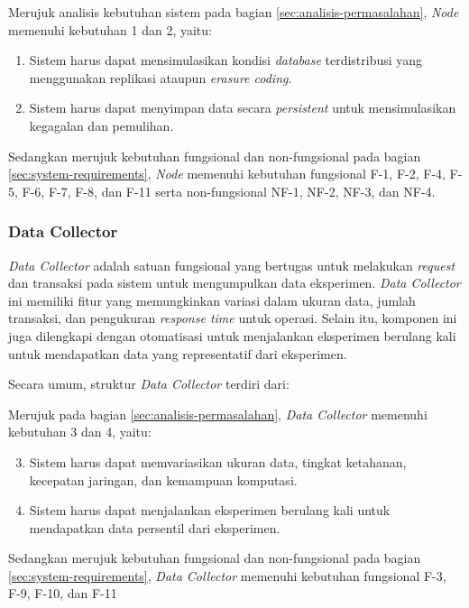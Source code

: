 Merujuk analisis kebutuhan sistem pada bagian \ref{sec:analisis-permasalahan}, \textit{Node} memenuhi kebutuhan 1 dan 2, yaitu:

\begin{enumerate}
    \item Sistem harus dapat mensimulasikan kondisi \textit{database} terdistribusi yang menggunakan replikasi ataupun \textit{erasure coding}.
    \item Sistem harus dapat menyimpan data secara \textit{persistent} untuk mensimulasikan kegagalan dan pemulihan.
\end{enumerate}

Sedangkan merujuk kebutuhan fungsional dan non-fungsional pada bagian \ref{sec:system-requirements}, \textit{Node} memenuhi kebutuhan fungsional F-1, F-2, F-4, F-5, F-6, F-7, F-8, dan F-11 serta non-fungsional NF-1, NF-2, NF-3, dan NF-4.

\subsubsection{Data Collector}
\label{subsubsection:data-collector}

\textit{Data Collector} adalah satuan fungsional yang bertugas untuk melakukan \textit{request} dan transaksi pada sistem untuk mengumpulkan data eksperimen. \textit{Data Collector} ini memiliki fitur yang memungkinkan variasi dalam ukuran data, jumlah transaksi, dan pengukuran \textit{response time} untuk operasi. Selain itu, komponen ini juga dilengkapi dengan otomatisasi untuk menjalankan eksperimen berulang kali untuk mendapatkan data yang representatif dari eksperimen.

Secara umum, struktur \textit{Data Collector} terdiri dari:


Merujuk pada bagian \ref{sec:analisis-permasalahan}, \textit{Data Collector} memenuhi kebutuhan 3 dan 4, yaitu:

\begin{enumerate}
    \setcounter{enumi}{2}
    \item Sistem harus dapat memvariasikan ukuran data, tingkat ketahanan, kecepatan jaringan, dan kemampuan komputasi.
    \item Sistem harus dapat menjalankan eksperimen berulang kali untuk mendapatkan data persentil dari eksperimen.
\end{enumerate}

Sedangkan merujuk kebutuhan fungsional dan non-fungsional pada bagian \ref{sec:system-requirements}, \textit{Data Collector} memenuhi kebutuhan fungsional F-3, F-9, F-10, dan F-11
